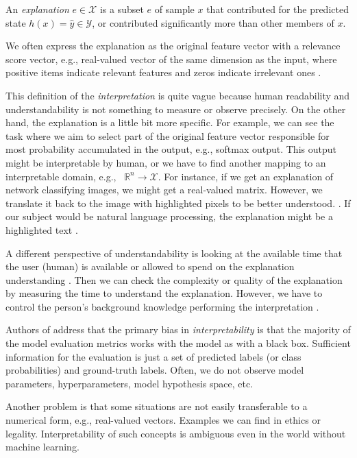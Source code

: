 \begin{definition}
An \emph{explanation} $e \in \mathcal{X}$ is a subset $e$ of sample $x$ that contributed for the predicted state $h(x)=\hat{y} \in \mathcal{Y}$, or contributed significantly more than other members of $x$.
\end{definition}

We often express the explanation as the original feature vector with a relevance score vector, e.g., real-valued vector of the same dimension as the input, where positive items indicate relevant features and zeros indicate irrelevant ones \cite{Montavon2018}.

This definition of the \emph{interpretation} is quite vague because human readability and understandability is not something to measure or observe precisely. On the other hand, the explanation is a little bit more specific. For example, we can see the task where we aim to select part of the original feature vector responsible for most probability accumulated in the output, e.g., softmax output. This output might be interpretable by human, or we have to find another mapping to an interpretable domain, e.g., \ $\mathbb{R}^{n}\rightarrow\mathcal{X}$. For instance, if we get an explanation of network classifying images, we might get a real-valued matrix. However, we translate it back to the image with highlighted pixels to be better understood. \cite{Lapuschkin2015, Simonyan2014, Landecker2013}. If our subject would be natural language processing, the explanation might be a highlighted text \cite{Arras2017, Li2016}.

A different perspective of understandability is looking at the available time that the user (human) is available or allowed to spend on the explanation understanding \cite{Guidotti2018}. Then we can check the complexity or quality of the explanation by measuring the time to understand the explanation. However, we have to control the person's background knowledge performing the interpretation \cite{Guidotti2018}.

Authors of \cite{Montavon2018} address that the primary bias in \emph{interpretability} is that the majority of the model evaluation metrics works with the model as with a black box. Sufficient information for the evaluation is just a set of predicted labels (or class probabilities) and ground-truth labels. Often, we do not observe model parameters, hyperparameters, model hypothesis space, etc. 

Another problem is that some situations are not easily transferable to a numerical form, e.g., real-valued vectors. Examples we can find in ethics or legality. Interpretability of such concepts is ambiguous even in the world without machine learning.

